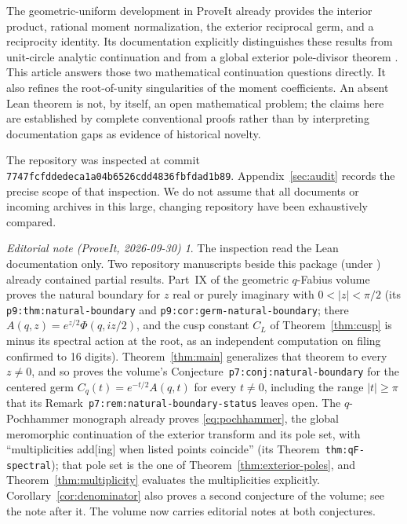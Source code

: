 \documentclass[11pt,a4paper]{article}
\numberwithin{equation}{section}
\theoremstyle{definition}
\theoremstyle{remark}
\newtheorem*{ednote}{Editorial note (ProveIt, 2026-09-30)}
\begin{document}
The geometric-uniform development in ProveIt already provides the interior product, rational moment normalization, the exterior reciprocal germ, and a reciprocity identity. Its documentation explicitly distinguishes these results from unit-circle analytic continuation and from a global exterior pole-divisor theorem \cite{repo}. This article answers those two mathematical continuation questions directly. It also refines the root-of-unity singularities of the moment coefficients. An absent Lean theorem is not, by itself, an open mathematical problem; the claims here are established by complete conventional proofs rather than by interpreting documentation gaps as evidence of historical novelty.

The repository was inspected at commit \texttt{7747fcfddedeca1a04b6526cdd4836fbfdad1b89}. Appendix~\ref{sec:audit} records the precise scope of that inspection. We do not assume that all documents or incoming archives in this large, changing repository have been exhaustively compared.
\begin{ednote}
The inspection read the Lean documentation only. Two repository manuscripts
beside this package (under
)
already contained partial results. Part~IX of the geometric $q$-Fabius
volume  proves the natural boundary for
$z$ real or purely imaginary with $0<|z|<\pi/2$ (its
\texttt{p9:thm:natural-boundary} and \texttt{p9:cor:germ-natural-boundary};
there $A(q,z)=e^{z/2}\Phi(q,iz/2)$, and the cusp constant $C_L$ of
Theorem~\ref{thm:cusp} is minus its spectral action at the root, as an
independent computation on filing confirmed to 16 digits). Theorem~\ref{thm:main}
generalizes that theorem to every $z\ne0$, and so proves the volume's
Conjecture~\texttt{p7:conj:natural-boundary} for the centered germ
$C_q(t)=e^{-t/2}A(q,t)$ for every $t\ne0$, including the range $|t|\ge\pi$
that its Remark~\texttt{p7:rem:natural-boundary-status} leaves open.
The $q$-Pochhammer monograph 
already proves \eqref{eq:pochhammer}, the global meromorphic continuation of
the exterior transform and its pole set, with ``multiplicities add[ing] when
listed points coincide'' (its Theorem~\texttt{thm:qF-spectral}); that pole
set is the one of Theorem~\ref{thm:exterior-poles}, and
Theorem~\ref{thm:multiplicity} evaluates the multiplicities explicitly.
Corollary~\ref{cor:denominator} also proves a second conjecture of the
volume; see the note after it. The volume now carries editorial notes at both
conjectures.
\end{ednote}
\end{document}
